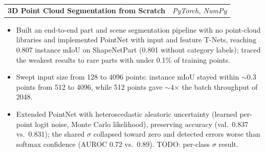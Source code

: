 \documentclass[letterpaper,11pt]{article}
\begin{document}
\begin{tabularx}{\linewidth}{ @{}X r@{} }
\textbf{3D Point Cloud Segmentation from Scratch} %
 & \textit{\small PyTorch, NumPy} \\
\end{tabularx}
\vspace{-1.2em}
\begin{itemize}
    \item[--] Built an end-to-end part and scene segmentation pipeline with no point-cloud libraries and implemented PointNet with input and feature T-Nets, reaching 0.807 instance mIoU on ShapeNetPart (0.801 without category labels); traced the weakest results to rare parts with under 0.1\% of training points.\vspace{-0.5em}
    \item[--] Swept input size from 128 to 4096 points: instance mIoU stayed within $\sim$0.3 points from 512 to 4096, while 512 points gave $\sim$4$\times$ the batch throughput of 2048.\vspace{-0.5em}
    \item[--] Extended PointNet with heteroscedastic aleatoric uncertainty (learned per-point logit noise, Monte Carlo likelihood), preserving accuracy (val.\ 0.837 vs.\ 0.831); the shared $\sigma$ collapsed toward zero and detected errors worse than softmax confidence (AUROC 0.72 vs.\ 0.89). TODO: per-class $\sigma$ result.
\end{itemize}
\vspace{-0.2em}
\end{document}
